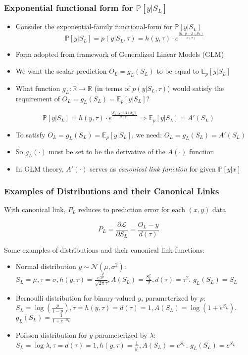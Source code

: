 \documentclass[handout]{beamer}
\begin{document}
\begin{frame}
\frametitle{Exponential functional form for $\mathbb{P}[y|S_L]$}
\pause
\begin{itemize}[<+->]
\item Consider the exponential-family functional-form for $\mathbb{P}[y|S_L]$
$$\mathbb{P}[y|S_L] = p(y|S_L, \tau) = h(y, \tau) \cdot e^{\frac {S_L \cdot y - A(S_L)} {d(\tau)}}$$
\item Form adopted from framework of Generalized Linear Models (GLM)
\item We want the scalar prediction $O_L = g_L(S_L)$ to be equal to $\mathbb{E}_p[y|S_L]$
\item What function $g_L: \mathbb{R} \rightarrow \mathbb{R}$ (in terms of $p(y|S_L, \tau)$) would satisfy the requirement of $O_L = g_L(S_L) = \mathbb{E}_p[y|S_L]$?
\end{itemize}
\pause
\begin{lemma}
$$\mathbb{P}[y|S_L] = h(y, \tau) \cdot e^{\frac {S_L \cdot y - A(S_L)} {d(\tau)}} \Rightarrow \mathbb{E}_p[y|S_L] = A'(S_L)$$
\end{lemma}
\pause
\begin{itemize}[<+->]
\item To satisfy $O_L = g_L(S_L) = \mathbb{E}_p[y|S_L]$, we need: $O_L = g_L(S_L) = A'(S_L)$
\item So $g_L(\cdot)$ must be set to be the derivative of the $A(\cdot)$ function
\item In GLM theory, $A'(\cdot)$ serves as {\em canonical link function} for given $\mathbb{P}[y|x]$
\end{itemize}
\end{frame}

\begin{frame}
\frametitle{Examples of Distributions and their Canonical Links}
With canonical link, $P_L$ reduces to prediction error for each $(x,y)$ data
\begin{theorem}
$$P_L =  \frac {\partial \mathcal{L}}{\partial S_L} = \frac {O_L - y} {d(\tau)}$$
\end{theorem}
\pause
Some examples of distributions and their canonical link functions:
\begin{itemize}
\item Normal distribution $y \sim \mathcal{N}(\mu, \sigma^2)$: $S_L = \mu, \tau = \sigma, h(y, \tau) = \frac {e^{\frac {-y^2} {2 \tau^2}}} {\sqrt{2 \pi} \tau}, A(S_L) = \frac {S_L^2} {2}, d(\tau) = \tau^2$. $g_L(S_L) = S_L$
\item Bernoulli distribution for binary-valued $y$, parameterized by $p$: $S_L = \log{(\frac p {1-p})}, \tau = h(y, \tau) = d(\tau) = 1, A(S_L) = \log{(1+e^{S_L})}$. $g_L(S_L) = \frac 1 {1+e^{-S_L}}$
\item Poisson distribution for $y$ parameterized by $\lambda$:
$S_L = \log{\lambda}, \tau = d(\tau) = 1, h(y, \tau) = \frac 1 {y!}, A(S_L) = e^{S_L}$.  $g_L(S_L) = e^{S_L}$
\end{itemize}
\end{frame}
\end{document}
